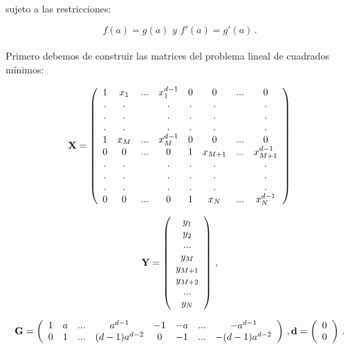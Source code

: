 \documentclass[
]{agujournal2019}
\begin{document}
sujeto a las restricciones:

\[f(a)=g(a)\,\,y\,\,f'(a)=g'(a)\,.\]\\

Primero debemos de construir las matrices del problema lineal de
cuadrados mínimos:

\[ {\textbf X}=\left(\begin{array}{cccccccc}
  1 & x_1   & .  .  . & x_1^{d-1}  & 0 & 0 & .  .  . & 0 \\
  . & .         &  & .                  & . & . &  & . \\
  . & .         &  & .                  & . & . &  & . \\
  . & .         &  & .                  & . & . &  & . \\
  1 & x_M & .  .  . & x_M^{d-1} & 0 & 0 & .  .  . & 0 \\
  0 & 0       & .  .  . & 0                 & 1 & x_{M+1} & .  .  . & x^{d-1}_{M+1} \\
  . & .         && .                  & . & . &  & . \\
  . & .         & & .                  & . & . &  & . \\
  . & .         &  & .                  & . & . &  & . \\
  0 & 0       & .  .  . & 0                & 1  & x_N & .  .  . & x_N^{d-1} \\
  \end{array}\right)
  \]

\[{\textbf Y}=\left(\begin{array}{c}
    y_1 \\ y_2 \\ . . . \\ y_M \\ y_{M+1}\\ y_{M+2}\\...\\y_N
      \end{array}\right)\,,\]

\[{\textbf G}=\left(\begin{array}{cccccccc}
        1 & a & .  .  .&a^{d-1}&-1&-a& .  .  .&-a^{d-1}\\
        0 & 1 & .  .  .&(d-1)a^{d-2}&0&-1& .  .  .&-(d-1)a^{d-2}\\
          \end{array}\right)\,,
          {\textbf d}=\left(\begin{array}{c}
            0\\
            0\\
              \end{array}\right)\,.\]
\end{document}
